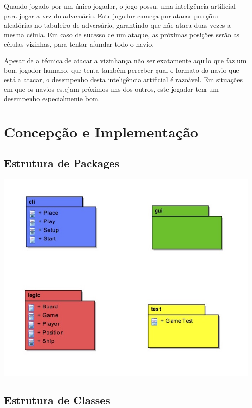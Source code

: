 \documentclass[12pt,a4paper,reqno]{report}
\numberwithin{equation}{section}
\begin{document}
	Quando jogado por um único jogador, o jogo possui uma inteligência artificial para jogar a vez do adversário. Este jogador começa por atacar posições aleatórias no tabuleiro do adversário, garantindo que não ataca duas vezes a mesma célula. Em caso de sucesso de um ataque, as próximas posições serão as células vizinhas, para tentar afundar todo o navio.
	
	Apesar de a técnica de atacar a vizinhança não ser exatamente aquilo que faz um bom jogador humano, que tenta também perceber qual o formato do navio que está a atacar, o desempenho desta inteligência artificial é razoável. Em situações em que os navios estejam próximos uns dos outros, este jogador tem um desempenho especialmente bom.

\chapter{Concepção e Implementação}


\section{Estrutura de Packages}

\begin{center}

\includegraphics[width=16cm]{package.jpg}

\end{center}

\section{Estrutura de Classes}
\end{document}
